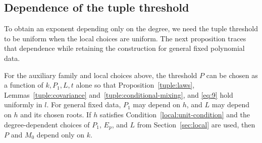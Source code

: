 \subsection{Dependence of the tuple threshold}

To obtain an exponent depending only on the degree, we need the tuple
threshold to be uniform when the local choices are uniform.  The next
proposition traces that dependence while retaining the construction for
general fixed polynomial data.

\begin{proposition}
\label{tuple:threshold-dependence}
For the auxiliary family and local choices above, the threshold $P$ can
be chosen as a function of $k,P_1,L,t$ alone so that
Proposition~\ref{tuple:laws}, Lemmas~\ref{tuple:covariance}
and~\ref{tuple:conditional-mixing}, and \eqref{eq:9} hold uniformly in
$l$.  For general fixed data, $P_1$ may depend on $h$, and $L$ may depend
on $h$ and its chosen roots.  If $h$ satisfies Condition~\eqref{local:unit-condition}
and the degree-dependent choices of $P_1$, $E_p$, and $L$ from
Section~\ref{sec:local} are used, then $P$ and $M_0$ depend only on $k$.
\end{proposition}

